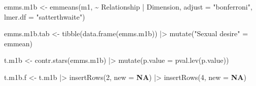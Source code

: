 \documentclass[
  bookmarksnumbered]{article}
\newenvironment{Shaded}{\begin{snugshade}}{\end{snugshade}}
\newcommand{\AttributeTok}[1]{\textcolor[rgb]{0.80,0.80,0.80}{#1}}
\newcommand{\ConstantTok}[1]{\textcolor[rgb]{0.86,0.64,0.64}{\textbf{#1}}}
\newcommand{\DecValTok}[1]{\textcolor[rgb]{0.86,0.86,0.80}{#1}}
\newcommand{\FunctionTok}[1]{\textcolor[rgb]{0.94,0.94,0.56}{#1}}
\newcommand{\NormalTok}[1]{\textcolor[rgb]{0.80,0.80,0.80}{#1}}
\newcommand{\OtherTok}[1]{\textcolor[rgb]{0.94,0.94,0.56}{#1}}
\newcommand{\SpecialCharTok}[1]{\textcolor[rgb]{0.86,0.64,0.64}{#1}}
\newcommand{\StringTok}[1]{\textcolor[rgb]{0.80,0.58,0.58}{#1}}
\begin{document}
\begin{Shaded}
\begin{Highlighting}[]
\NormalTok{emms.m1b }\OtherTok{\textless{}{-}} \FunctionTok{emmeans}\NormalTok{(m1, }\SpecialCharTok{\textasciitilde{}}\NormalTok{ Relationship }\SpecialCharTok{|}\NormalTok{ Dimension,}
                    \AttributeTok{adjust =} \StringTok{"bonferroni"}\NormalTok{,}
                    \AttributeTok{lmer.df =} \StringTok{"satterthwaite"}\NormalTok{)}

\NormalTok{emms.m1b.tab }\OtherTok{\textless{}{-}} \FunctionTok{tibble}\NormalTok{(}\FunctionTok{data.frame}\NormalTok{(emms.m1b)) }\SpecialCharTok{|\textgreater{}}
  \FunctionTok{mutate}\NormalTok{(}\StringTok{"Sexual desire"} \OtherTok{=}\NormalTok{ emmean)}

\NormalTok{t.m1b }\OtherTok{\textless{}{-}} \FunctionTok{contr.stars}\NormalTok{(emms.m1b) }\SpecialCharTok{|\textgreater{}} 
  \FunctionTok{mutate}\NormalTok{(}\AttributeTok{p.value =} \FunctionTok{pval.lev}\NormalTok{(p.value))}

\NormalTok{t.m1b.f }\OtherTok{\textless{}{-}}\NormalTok{ t.m1b }\SpecialCharTok{|\textgreater{}} 
  \FunctionTok{insertRows}\NormalTok{(}\DecValTok{2}\NormalTok{, }\AttributeTok{new =} \ConstantTok{NA}\NormalTok{) }\SpecialCharTok{|\textgreater{}}
  \FunctionTok{insertRows}\NormalTok{(}\DecValTok{4}\NormalTok{, }\AttributeTok{new =} \ConstantTok{NA}\NormalTok{)}


\end{Highlighting}
\end{Shaded}
\end{document}
